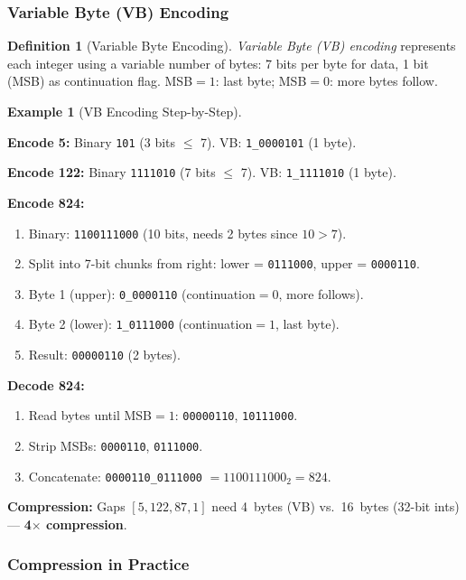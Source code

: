 \documentclass[11pt,a4paper]{article}
\theoremstyle{definition}
\newtheorem{definition}{Definition}[section]
\newtheorem{example}{Example}[section]
\theoremstyle{plain}
\begin{document}
\subsubsection{Variable Byte (VB) Encoding}

\begin{definition}[Variable Byte Encoding]
\emph{Variable Byte (VB) encoding} represents each integer using a variable number of bytes: 7 bits per byte for data, 1 bit (MSB) as continuation flag. MSB$=1$: last byte; MSB$=0$: more bytes follow.
\end{definition}

\begin{example}[VB Encoding Step-by-Step]
\label{ex:vb}

\textbf{Encode 5:} Binary \texttt{101} (3 bits $\leq$ 7). VB: \texttt{1\_0000101} (1 byte).

\textbf{Encode 122:} Binary \texttt{1111010} (7 bits $\leq$ 7). VB: \texttt{1\_1111010} (1 byte).

\textbf{Encode 824:}
\begin{enumerate}[nosep]
    \item Binary: \texttt{1100111000} (10 bits, needs 2 bytes since $10 > 7$).
    \item Split into 7-bit chunks from right: lower = \texttt{0111000}, upper = \texttt{0000110}.
    \item Byte 1 (upper): \texttt{0\_0000110} (continuation$=0$, more follows).
    \item Byte 2 (lower): \texttt{1\_0111000} (continuation$=1$, last byte).
    \item Result: \texttt{00000110} (2 bytes).
\end{enumerate}

\textbf{Decode 824:}
\begin{enumerate}[nosep]
    \item Read bytes until MSB$=1$: \texttt{00000110}, \texttt{10111000}.
    \item Strip MSBs: \texttt{0000110}, \texttt{0111000}.
    \item Concatenate: \texttt{0000110\_0111000} $= 1100111000_2 = 824$.
\end{enumerate}

\textbf{Compression:} Gaps $[5, 122, 87, 1]$ need 4~bytes (VB) vs.\ 16~bytes (32-bit ints) --- \textbf{4$\times$ compression}.
\end{example}

\subsubsection{Compression in Practice}
\end{document}
